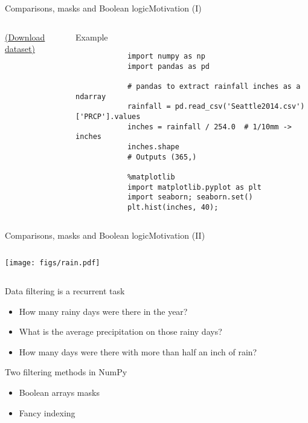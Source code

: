 \documentclass[10pt,compress]{beamer} %
\begin{document}
\begin{frame}[fragile]{Comparisons, masks and Boolean logic}{Motivation (I)}
	\vspace{-0.2cm} 
	\begin{columns}
		\href{https://raw.githubusercontent.com/jakevdp/PythonDataScienceHandbook/master/notebooks/data/Seattle2014.csv}{(Download dataset)}
		\begin{exampleblock}{Example}
		\vspace{-0.2cm} 
			\begin{lstlisting}
			import numpy as np
			import pandas as pd
             
			# pandas to extract rainfall inches as a ndarray
			rainfall = pd.read_csv('Seattle2014.csv')['PRCP'].values
			inches = rainfall / 254.0  # 1/10mm -> inches
			inches.shape 
			# Outputs (365,)
			 
			%matplotlib 
			import matplotlib.pyplot as plt
			import seaborn; seaborn.set()
			plt.hist(inches, 40);
			\end{lstlisting}
		\vspace{-0.2cm} 
		\end{exampleblock}
	\end{columns}
\end{frame}

\begin{frame}[fragile]{Comparisons, masks and Boolean logic}{Motivation (II)}
	\begin{columns}
 	   \column{0.4\textwidth}
		\texttt{[image: figs/rain.pdf]}	
	\end{columns}

	Data filtering is a recurrent task
	\begin{itemize}
		\item How many rainy days were there in the year?
		\item What is the average precipitation on those rainy days?
		\item How many days were there with more than half an inch of rain?
	\end{itemize}

	Two filtering methods in NumPy
	\begin{itemize}
		\item Boolean arrays masks
		\item Fancy indexing
	\end{itemize}
\end{frame}
\end{document}

